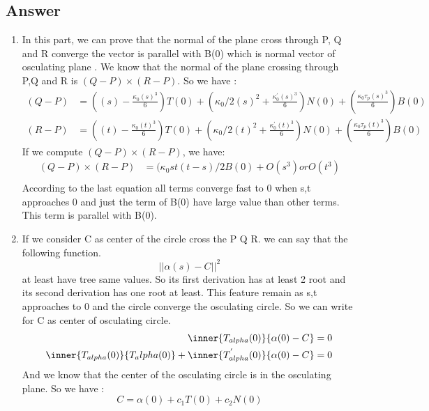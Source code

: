 \documentclass[
	12pt, %
]{fphw}
\theoremstyle{plain}
\begin{document}
\subsection*{Answer}
\begin{enumerate}
     \item In this part, we can prove that the normal of the plane cross through P, Q and R converge the vector is parallel with B(0) which is normal vector of osculating plane
      . We know that the normal of the plane crossing through P,Q and R is $(Q-P) \times (R-P)$. So we have :
      \begin{align}
          (Q-P) & = ((s)-\frac{\kappa_{0}(s)^{3}}{6}) T(0) + (\kappa_{0}/2(s)^{2}+\frac{\kappa^{'}_{0}(s)^{3}}{6}) N(0) + (\frac{\kappa_{0}\tau_{p}(s)^{3}}{6}) B(0) \\
          (R-P) & = ((t)-\frac{\kappa_{0}(t)^{3}}{6}) T(0) + (\kappa_{0}/2(t)^{2}+\frac{\kappa^{'}_{0}(t)^{3}}{6}) N(0) + (\frac{\kappa_{0}\tau_{p}(t)^{3}}{6}) B(0)
     \end{align}
     If we compute $(Q-P) \times (R-P)$, we have:
     \begin{align}
          (Q-P) \times (R-P) & = (\kappa_{0}st(t-s)/2 B(0) + O(s^{3}) or O(t^{3}) \\
     \end{align}
     According to the last equation all terms converge fast to 0 when s,t approaches 0 and just the term of B(0) have large value than other terms. This term is parallel  with B(0).
     \item If we consider C as center of the circle cross the P Q R. we can say that the following function.
     \begin{equation}
           ||\alpha(s)-C||^2  
     \end{equation}
     at least have tree  same values. So its first derivation has at least 2 root and its second derivation has one root at  least. This feature remain as s,t approaches to 0 and the circle converge the osculating circle. So we can write for C as center of osculating circle.
     \begin{align}
          \inner{T_{alpha}(0)}{\alpha(0)-C} & = 0 \\ 
          \inner{T_{alpha}(0)}{T_alpha(0)} + \inner{T_{alpha}^{'}(0)}{\alpha(0)-C} & = 0
    \end{align}
    And we know that the center of the osculating circle is in the osculating plane. So we have :
    \begin{equation}
         C = \alpha(0) + c_{1} T(0) + c_{2} N(0)    

\end{equation}
\end{enumerate}
\end{document}
